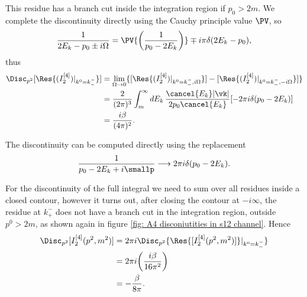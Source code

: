 This residue has a branch cut inside the integration region if $p_0 > 2m$. We complete the discontinuity directly using the Cauchy principle value $\PV$, so
\begin{equation}
    \frac{1}{2E_k - p_0 \pm i\Omega} = \PV{\bigg(\frac{1}{p_0 - 2E_k}\bigg)} \mp i\pi\delta(2E_k - p_0),
\end{equation}
thus 
\begin{equation}
    \begin{split}
        \Disc_{p^2}[\Res{(I^{[4]}_2)|_{k^0 = k_-^-}}] &= \lim_{\Omega \to 0}\{[\Res{(I^{[4]}_2)|_{k^0 = k_-^-,i\Omega}}] - [\Res{(I^{[4]}_2)|_{k^0 = k_-^-,-i\Omega}}]\} \\
        &= \frac{2}{(2\pi)^3}\int_m^\infty dE_k\,\frac{\cancel{E_k}|\vk|}{2p_0\cancel{E_k}}[-2\pi i\delta(p_0 - 2E_k)] \\
        &= \frac{i\beta}{(4\pi)^2}.
    \end{split}
\end{equation}
\begin{obs}
    The discontinuity can be computed directly using the replacement 
    \begin{equation}
        \frac{1}{p_0 - 2E_k + i\smallp} \longrightarrow 2\pi i\delta(p_0 - 2E_k).
    \end{equation}
\end{obs}
For the discontinuity of the full integral we need to sum over all residues inside a closed contour, however it turns out, after closing the contour at $-i\infty$, the residue at $k_+^-$ does not have a branch cut in the integration region, outside $p^0 > 2m$, as shown again in figure \ref{fig: A4 disconiutities in s12 channel}. Hence
\begin{equation}
    \begin{split}
        \Disc_{p^2}[I^{[4]}_2(p^2,m^2)] &= 2\pi i\Disc_{p^2}\{\Res{[I_2^{[4]}(p^2,m^2)]}|_{k^0 = k_-^-}\} \\
        &= 2\pi i\bigg(\frac{i\beta}{16\pi^2}\bigg) \\
        &= -\frac{\beta}{8\pi}.
    \end{split}
\end{equation}
